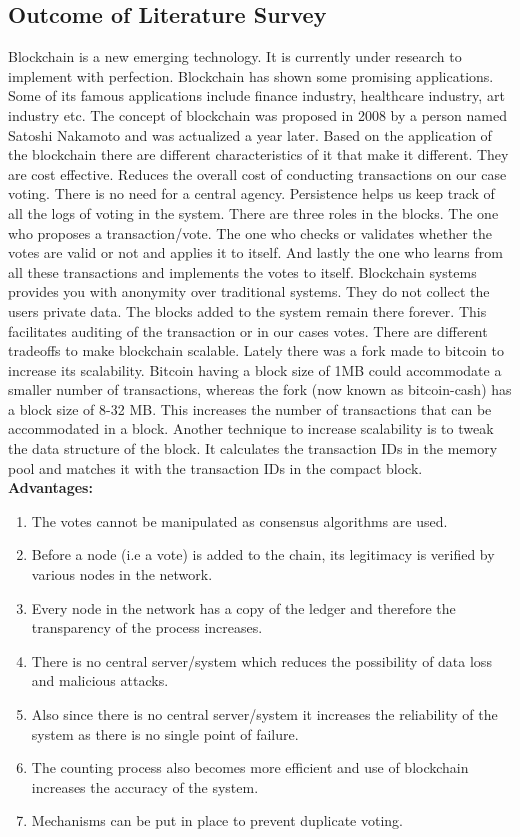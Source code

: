 \documentclass[oneside, 12pt]{book}
\begin{document}
\subsection{Outcome of Literature Survey}
Blockchain is a new emerging technology. It is currently under research to implement with perfection. Blockchain has shown some promising applications. Some of its famous applications include finance industry, healthcare industry, art industry etc. The concept of blockchain was proposed in 2008 by a person named Satoshi Nakamoto and was actualized a year later. Based on the application of the blockchain there are different characteristics of it that make it different. They are cost effective. Reduces the overall cost of conducting transactions on our case voting. There is no need for a central agency. Persistence helps us keep track of all the logs of voting in the system. There are three roles in the blocks. The one who proposes a transaction/vote. The one who checks or validates whether the votes are valid or not and applies it to itself. And lastly the one who learns from all these transactions and implements the votes to itself. Blockchain systems provides you with anonymity over traditional systems. They do not collect the users private data. The blocks added to the system remain there forever. This facilitates auditing of the transaction or in our cases votes. There are different tradeoffs to make blockchain scalable. Lately there was a fork made to bitcoin to increase its scalability. Bitcoin having a block size of 1MB could accommodate a smaller number of transactions, whereas the fork (now known as bitcoin-cash) has a block size of 8-32 MB. This increases the number of transactions that can be accommodated in a block. Another technique to increase scalability is to tweak the data structure of the block. It calculates the transaction IDs in the memory pool and matches it with the transaction IDs in the compact block.
\\\textbf{Advantages:}
\begin{enumerate}
	\item The votes cannot be manipulated as consensus algorithms are used.
	\item Before a node (i.e a vote) is added to the chain, its legitimacy is verified by various nodes in the network.
	\item Every node in the network has a copy of the ledger and therefore the transparency of the process increases.
	\item There is no central server/system which reduces the possibility of data loss and malicious attacks.
	\item Also since there is no central server/system it increases the reliability of the system as there is no single point of failure.
	\item The counting process also becomes more efficient and use of blockchain increases the accuracy of the system.
	\item Mechanisms can be put in place to prevent duplicate voting.
\end{enumerate}
\end{document}
